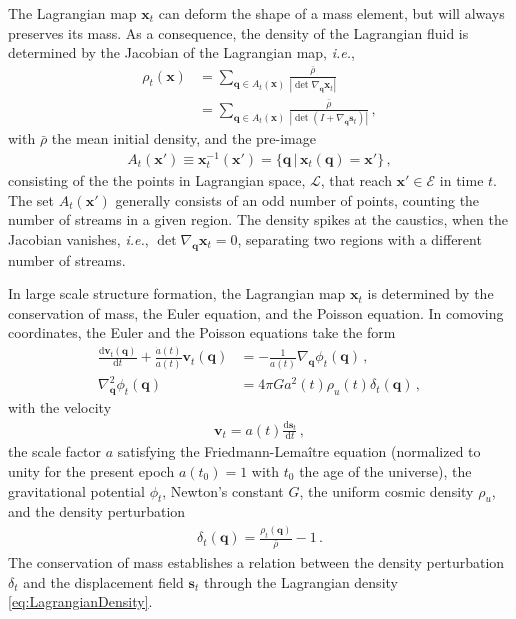 \documentclass[a4paper, 11pt]{article}
\begin{document}
The Lagrangian map $\bm{x}_t$ can deform the shape of a mass element, but will always preserves its mass. As a consequence, the density of the Lagrangian fluid is determined by the Jacobian of the Lagrangian map, \textit{i.e.},
\begin{align}
\rho_t(\bm{x}) &= \sum_{\bm{q} \in A_t(\bm{x})} \frac{\bar{\rho}}{|\det \nabla_{\bm{q}} \bm{x}_t|}\nonumber \\
&= \sum_{\bm{q} \in A_t(\bm{x})} \frac{\bar{\rho}}{|\det (I + \nabla_{\bm{q}} \bm{s}_t)|}\,,
\label{eq:LagrangianDensity}
\end{align}
with $\bar{\rho}$ the mean initial density, and the pre-image
\begin{align}
A_t(\bm{x}') \equiv \bm{x}_t^{-1}(\bm{x}') = \{\bm{q} \,|\, \bm{x}_t(\bm{q})= \bm{x}'\}\,,
\end{align}
consisting of the the points in Lagrangian space, $\mathcal{L}$, that reach $\bm{x}'\in \mathcal{E}$ in time $t$. The set $A_t(\bm{x}')$ generally consists of an odd number of points, counting the number of streams in a given region. The density spikes at the caustics, when the Jacobian vanishes, \textit{i.e.}, $\det \nabla_{\bm{q}}\bm{x}_t=0$, separating two regions with a different number of streams. 

In large scale structure formation, the Lagrangian map $\bm{x}_t$ is determined by the conservation of mass, the Euler equation, and the Poisson equation. In comoving coordinates, the Euler and the Poisson equations take the form
\begin{align}
\frac{\mathrm{d} \bm{v}_t(\bm{q})}{\mathrm{d}t} + \frac{\dot{a}(t)}{a(t)}\bm{v}_t(\bm{q}) &= - \frac{1}{a(t)} \nabla_{\bm{q}} \phi_t(\bm{q})\,,\\
\nabla_{\bm{q}}^2 \phi_t(\bm{q}) &= 4 \pi G a^2(t) \rho_u(t) \delta_t(\bm{q})\,,
\end{align}
with the velocity
\begin{align}
\bm{v}_t = a(t) \frac{\mathrm{d}\bm{s}_t}{\mathrm{d}t}\,,
\end{align}
the scale factor $a$ satisfying the Friedmann-Lema\^itre equation (normalized to unity for the present epoch $a(t_0)=1$ with $t_0$ the age of the universe), the gravitational potential $\phi_t$, Newton's constant $G$, the uniform cosmic density $\rho_u$, and the density perturbation
\begin{align}
\delta_t(\bm{q}) = \frac{\rho_t(\bm{q})}{\bar{\rho}} -1\,.
\end{align}
The conservation of mass establishes a relation between the density perturbation $\delta_t$ and the displacement field $\bm{s}_t$ through the Lagrangian density \eqref{eq:LagrangianDensity}.
\end{document}
